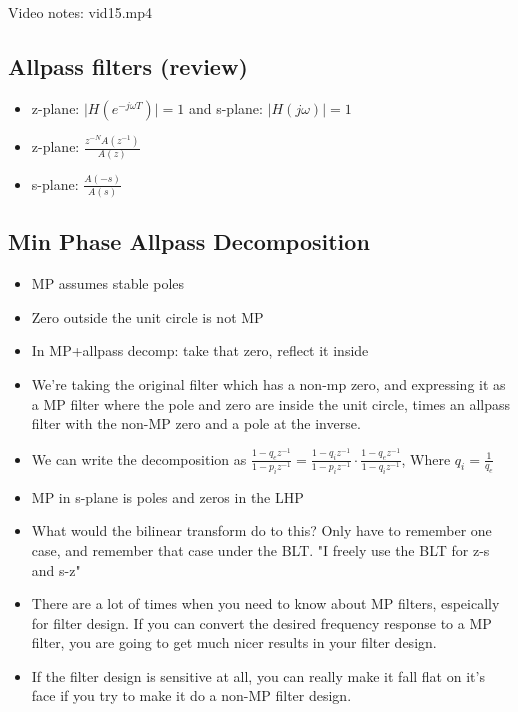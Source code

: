 Video notes: vid15.mp4
\subsection*{Allpass filters (review)}

\begin{itemize}
\item{
z-plane: $\vert H(e^{-j\omega T}) \vert = 1$ and
s-plane: $\vert H(j\omega) \vert = 1$ 
}
\item{
z-plane: $\frac{z^{-N}A(z^{-1})}{A(z)}$
}
\item{
s-plane: $\frac{A(-s)}{A(s)}$
}
\end{itemize}

\subsection*{Min Phase Allpass Decomposition }
\begin{itemize}
\item{MP assumes stable poles}
\item{Zero outside the unit circle is not MP}
\item{In MP+allpass decomp: take that zero, reflect it inside}
\item{
We're taking the original filter which has a non-mp zero, and 
expressing it as a MP filter where the pole and zero are inside 
the unit circle, times an allpass filter with the non-MP zero and
a pole at the inverse. 
}
\item{
We can write the decomposition as
$
\frac{1 - q_e z^{-1}}{1 - p_i z^{-1}} =
\frac{1 - q_i z^{-1}}{1 - p_i z^{-1}} \cdot
\frac{1 - q_ez^{-1}}{1 - q_i z^{-1}}
$, Where $q_i = \frac{1}{q_e}$
}
\item{
MP in s-plane is poles and zeros in the LHP
}
\item{
What would the bilinear transform do to this? Only have to remember
one case, and remember that case under the BLT. "I freely use the BLT
for z-s and s-z"
}
\item{
There are a lot of times when you need to know about MP filters, espeically
for filter design. If you can convert the desired frequency response
to a MP filter, you are going to get much nicer results in your 
filter design.
}
\item{
If the filter design is sensitive at all, you can really make it fall
flat on it's face if you try to make it do a non-MP filter design.
}
\end{itemize}
